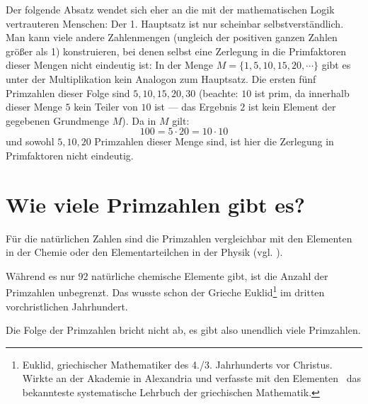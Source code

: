 \begin{refsegment}
Der folgende Absatz wendet sich eher an die mit der mathematischen Logik vertrauteren Menschen:
Der 1. Hauptsatz ist nur scheinbar selbstverständlich\label{remFundTheoOfArithm}. Man kann viele andere Zahlenmengen
(ungleich der positiven ganzen Zahlen größer als 1) konstruieren, bei denen selbst eine Zerlegung in
die Primfaktoren dieser Mengen nicht eindeutig ist:
In der Menge $M = \{1, 5, 10, 15, 20, \cdots\}$ gibt es unter der Multiplikation kein Analogon zum Hauptsatz.
Die ersten fünf Primzahlen dieser Folge sind $5, 10, 15, 20, 30$ (beachte: $10$ ist prim, da innerhalb
dieser Menge $5$ kein Teiler von $10$ ist --- das Ergebnis $2$ ist kein Element der gegebenen Grundmenge
$M$). Da in $M$ gilt:
$$ 100 = 5 \cdot 20 = 10 \cdot 10 $$
und sowohl $5, 10, 20$ Primzahlen dieser Menge sind, ist hier die Zerlegung in Primfaktoren nicht
eindeutig.

\section{Wie viele Primzahlen gibt es?}
\label{Section_pr_How-many-primes}

Für die natürlichen Zahlen sind die Primzahlen vergleichbar mit den
Elementen in der Chemie oder den Elementarteilchen in der Physik
(vgl. \cite[S. 22]{Blum1999}).

Während es nur $92$ natürliche chemische Elemente gibt, ist die Anzahl
der Primzahlen unbegrenzt.
Das wusste schon der Grieche  Euklid\footnote{%
Euklid, griechischer Mathematiker des 4./3. Jahrhunderts vor Christus.
Wirkte an der Akademie in Alexandria und verfasste mit den
\glqq Elementen\grqq~ das bekannteste systematische Lehrbuch
der griechischen Mathematik.}
im dritten vorchristlichen Jahrhundert.

\begin{satz}\label{thm-pz-euklid}\hypertarget{thm-pz-euklid}{} %
Die Folge der Primzahlen bricht nicht ab, es gibt also unendlich
viele Primzahlen.
\end{satz}


\end{refsegment}
